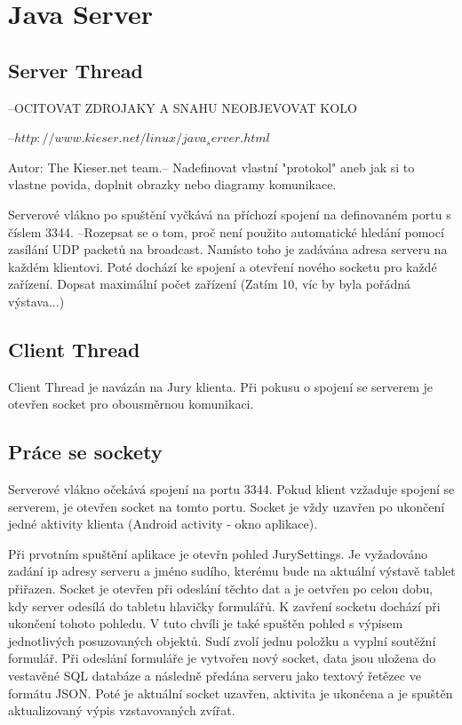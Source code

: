 \documentclass[11pt, oneside]{fithesis2}
\begin{document}
\chapter{Java Server}
\section{Server Thread}
--OCITOVAT ZDROJAKY A SNAHU NEOBJEVOVAT KOLO

--$http://www.kieser.net/linux/java_server.html$

Autor: The Kieser.net team.--
\linebreak
Nadefinovat vlastní "protokol" aneb jak si to vlastne povida, doplnit obrazky nebo diagramy komunikace.
\linebreak

Serverové vlákno po spuštění vyčkává na příchozí spojení na definovaném portu s číslem 3344. --Rozepsat se o tom, proč není použito automatické hledání pomocí zasílání UDP packetů na broadcast.
Namísto toho je zadávána adresa serveru na každém klientovi. Poté dochází ke spojení a otevření nového socketu pro každé zařízení. Dopsat maximální počet zařízení (Zatím 10, víc by byla pořádná výstava...)

\section{Client Thread}
Client Thread je navázán na Jury klienta. Při pokusu o spojení se serverem je otevřen socket pro obousměrnou komunikaci.

\section{Práce se sockety}
Serverové vlákno očekává spojení na portu 3344. Pokud klient vzžaduje spojení se serverem, je otevřen socket na tomto portu. Socket je vždy uzavřen po ukončení jedné aktivity klienta (Android activity - okno aplikace).

Při prvotním spuštění aplikace je otevřn pohled JurySettings. Je vyžadováno zadání ip adresy serveru a jméno sudího, kterému bude na aktuální výstavě tablet přiřazen. Socket je otevřen při odeslání
těchto dat a je oetvřen po celou dobu, kdy server odesílá do tabletu hlavičky formulářů. K zavření socketu dochází při ukončení tohoto pohledu.
V tuto chvíli je také spuštěn pohled s výpisem jednotlivých posuzovaných objektů. Sudí zvolí jednu položku a vyplní soutěžní formulář. Při odeslání formuláře je vytvořen nový socket, data jsou uložena do vestavěné SQL databáze
a následně předána serveru jako textový řetězec ve formátu JSON. Poté je aktuální socket uzavřen, aktivita je ukončena a je spuštěn aktualizovaný výpis vzstavovaných zvířat.
\end{document}
